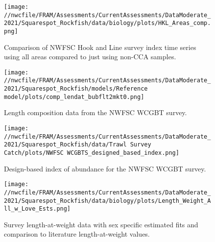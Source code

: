 \documentclass[11pt,
  english,
  a4paper,
]{article}
\begin{document}

\begin{figure}
\centering
\texttt{[image: //nwcfile/FRAM/Assessments/CurrentAssessments/DataModerate\_2021/Squarespot\_Rockfish/data/biology/plots/HKL\_Areas\_comp.png]}
\caption{Comparison of NWFSC Hook and Line survey index time series using all areas compared to just using non-CCA samples.\label{fig:hkl-index-comparison}}
\end{figure}

\tagmcend\tagstructend


\begin{figure}
\centering
\texttt{[image: //nwcfile/FRAM/Assessments/CurrentAssessments/DataModerate\_2021/Squarespot\_Rockfish/models/Reference model/plots/comp\_lendat\_bubflt2mkt0.png]}
\caption{Length composition data from the NWFSC WCGBT survey.\label{fig:wcgbts-len-data}}
\end{figure}

\tagmcend\tagstructend


\begin{figure}
\centering
\texttt{[image: //nwcfile/FRAM/Assessments/CurrentAssessments/DataModerate\_2021/Squarespot\_Rockfish/data/Trawl Survey Catch/plots/NWFSC WCGBTS\_designed\_based\_index.png]}
\caption{Design-based index of abundance for the NWFSC WCGBT survey.\label{fig:wcgbts-dbindex}}
\end{figure}

\tagmcend\tagstructend


\begin{figure}
\centering
\texttt{[image: //nwcfile/FRAM/Assessments/CurrentAssessments/DataModerate\_2021/Squarespot\_Rockfish/data/biology/plots/Length\_Weight\_All\_w\_Love\_Ests.png]}
\caption{Survey length-at-weight data with sex specific estimated fits and comparison to literature length-at-weight values.\label{fig:len-weight}}
\end{figure}
\end{document}
